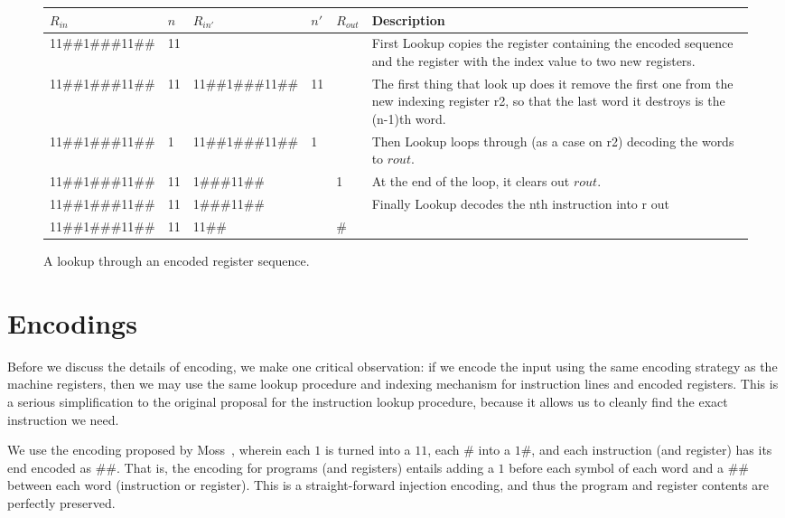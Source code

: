 \documentclass[10pt, preprint, nocopyrightspace]{sigplanconf}
\begin{document}
\begin{figure*}
\begin{tabular}{lllllp{}}
$R_{in}$ & $n$ & $R_{in'}$ & $n'$ & $R_{out}$ & Description\\\hline
11\#\#1\#\#\#11\#\#  & 11  & & & &
First Lookup copies the register containing the encoded sequence and the
register with the index value to two new registers.   \\

11\#\#1\#\#\#11\#\#  &
11  &
11\#\#1\#\#\#11\#\#  &
11  &
  &
The first thing that look up does it remove the first one from the new indexing
register r2, so that the last word it destroys is the (n-1)th word.    \\
11\#\#1\#\#\#11\#\#  &
1  &
11\#\#1\#\#\#11\#\#  &
1 &
  &
Then Lookup loops through (as a case on r2) decoding the words to $rout$.  \\
11\#\#1\#\#\#11\#\#  &
11  &
1\#\#\#11\#\#  &
  &
1 & 
At the end of the loop, it clears out $rout$.\\
11\#\#1\#\#\#11\#\#  &
11  &
1\#\#\#11\#\#  &
&
&
Finally Lookup decodes the nth instruction into r out  \\
11\#\#1\#\#\#11\#\#  &
11  &
11\#\#  &
&
\#  \\
\end{tabular}
\caption{\label{fig:lookup}A lookup through an encoded register sequence.}
\end{figure*}



\section{Encodings}

Before we discuss the details of encoding, we make one critical observation: if 
we encode the input using the same encoding strategy as the machine registers,
then we may use the same lookup procedure and indexing mechanism for instruction
lines and encoded registers. This is a serious simplification to the original
proposal for the instruction lookup procedure, because it allows us to cleanly
find the exact instruction we need.

We use the encoding proposed by Moss~\cite{moss}, wherein each $1$ is turned into a
$11$, each $\#$ into a $1\#$, and each instruction (and register) has its end
encoded as $\#\#$. That is, the encoding for programs (and registers) entails
adding a $1$ before each symbol of each word and a $\#\#$ between each word
(instruction or register). This is a straight-forward injection encoding, and
thus the program and register contents are perfectly preserved.
\end{document}
